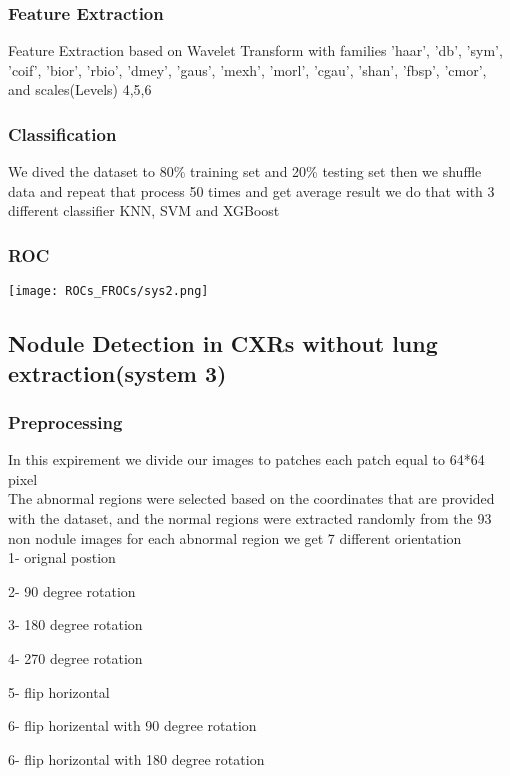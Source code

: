 \documentclass[hidelinks,12pt,xcolor=table]{article}
\begin{document}
\begin{multicols}{2}
\subsubsection{Feature Extraction}
Feature Extraction based on Wavelet Transform with families
'haar', 'db', 'sym', 'coif', 'bior', 'rbio', 'dmey', 'gaus',
'mexh', 'morl', 'cgau', 'shan', 'fbsp', 'cmor',
and scales(Levels) 4,5,6  

\subsubsection{Classification}
We dived the dataset to 80\% training set and 20\% testing set then we shuffle data and repeat that process 50 times and get average result we do that with 3 different classifier KNN, SVM and XGBoost

\subsubsection{ROC}
\begin{center}
  \centering
  \texttt{[image: ROCs\_FROCs/sys2.png]}
  \label{fig:sys2}
\end{center}



\subsection{Nodule Detection in CXRs without lung extraction(system 3)}
\subsubsection{Preprocessing}
In this expirement we divide our images to patches each patch equal to 64*64 pixel\\
The abnormal regions were selected based on the
coordinates that are provided with the dataset, and the
normal regions were extracted randomly from the 93 non nodule images
for each abnormal region we get 7 different orientation\\

1- orignal postion

2- 90 degree rotation

3- 180 degree rotation

4- 270 degree rotation

5- flip horizontal

6- flip horizental with 90 degree rotation

6- flip horizontal with 180 degree rotation


\end{multicols}
\end{document}
